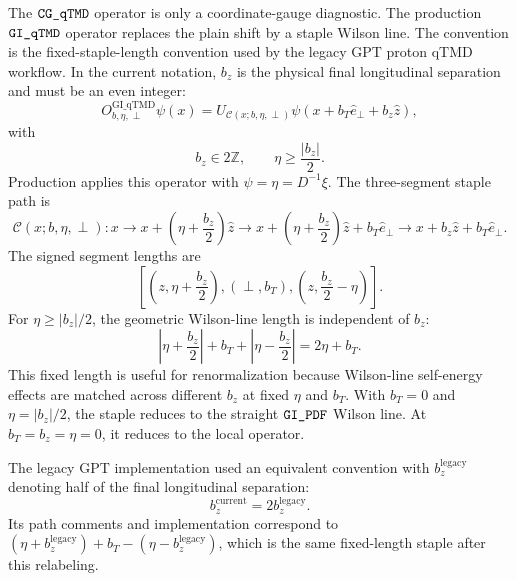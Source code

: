 \documentclass[11pt,a4paper]{article}
\newcommand{\code}[1]{\texttt{\begingroup\def\_{\textunderscore\allowbreak}#1\endgroup}}
\begin{document}
The \(\code{CG\_qTMD}\) operator is only a coordinate-gauge diagnostic.  The
production \(\code{GI\_qTMD}\) operator replaces the plain shift by a staple
Wilson line.  The convention is the fixed-staple-length convention used by the
legacy GPT proton qTMD workflow.  In the current notation, \(b_z\) is the
physical final longitudinal separation and must be an even integer:
\begin{equation}
  O_{b,\eta,\perp}^{\mathrm{GI\_qTMD}}\psi(x)
  =
  U_{\mathcal{C}(x;b,\eta,\perp)}
  \psi(x+b_T\hat{e}_{\perp}+b_z\hat{z}),
\end{equation}
with
\begin{equation}
  b_z \in 2\mathbb{Z}, \qquad
  \eta \geq \frac{|b_z|}{2}.
\end{equation}
Production applies this operator with \(\psi=\eta=D^{-1}\xi\).
The three-segment staple path is
\begin{equation}
  \mathcal{C}(x;b,\eta,\perp):
  x
  \rightarrow
  x+\left(\eta+\frac{b_z}{2}\right)\hat{z}
  \rightarrow
  x+\left(\eta+\frac{b_z}{2}\right)\hat{z}
    +b_T\hat{e}_{\perp}
  \rightarrow
  x+b_z\hat{z}+b_T\hat{e}_{\perp}.
\end{equation}
The signed segment lengths are
\begin{equation}
  \left[
    \left(z,\eta+\frac{b_z}{2}\right),
    (\perp,b_T),
    \left(z,\frac{b_z}{2}-\eta\right)
  \right].
\end{equation}
For \(\eta \geq |b_z|/2\), the geometric Wilson-line length is independent of
\(b_z\):
\begin{equation}
  \left|\eta+\frac{b_z}{2}\right|
  + b_T
  + \left|\eta-\frac{b_z}{2}\right|
  =
  2\eta+b_T.
\end{equation}
This fixed length is useful for renormalization because Wilson-line
self-energy effects are matched across different \(b_z\) at fixed \(\eta\) and
\(b_T\).  With \(b_T=0\) and \(\eta=|b_z|/2\), the staple reduces to the
straight \(\code{GI\_PDF}\) Wilson line.  At \(b_T=b_z=\eta=0\), it reduces to
the local operator.

The legacy GPT implementation used an equivalent convention with
\(b_z^{\mathrm{legacy}}\) denoting half of the final longitudinal separation:
\begin{equation}
  b_z^{\mathrm{current}} = 2 b_z^{\mathrm{legacy}}.
\end{equation}
Its path comments and implementation correspond to
\((\eta+b_z^{\mathrm{legacy}})+b_T-(\eta-b_z^{\mathrm{legacy}})\), which is the
same fixed-length staple after this relabeling.
\end{document}
